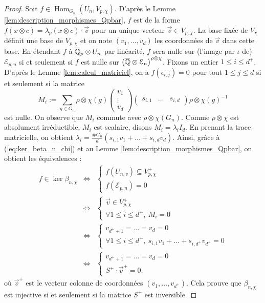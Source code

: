 \documentclass[12pt]{amsart}
\newcommand\bQ{\mathbb{Q}}
\newcommand\cE{\mathcal{E}}
\newcommand{\ob}[1]{\mkern 1.5mu\overline{\mkern-1.5mu#1\mkern-1.5mu}\mkern 1.5mu}
\DeclareMathOperator{\Hom}{Hom}
\theoremstyle{defstyle}
\theoremstyle{thmstyle}
\begin{document}
\begin{proof}
	Soit $f \in \Hom_{G_n}(U_n,V_{p,\chi})$. D'après le Lemme \ref{lem:description_morphismes_Qpbar}, $f$ est de la forme $f(x\otimes c) = \lambda_p(x\otimes c) \cdot \vec{v} $ pour un unique vecteur $\vec{v}\in V_{p,\chi}$. La base fixée de $V_\chi$ définit une base de $V_{p,\chi}$ et on note $(v_1,\ldots,v_d)$ les coordonnées de $\vec{v}$ dans cette base. En étendant $f$ à $\ob{\bQ}_p \otimes U_n$ par linéarité, $f$ sera nulle sur (l'image par $\iota$ de) $\cE_{p,n}$ si et seulement si $f$ est nulle sur $\left(\ob{\bQ}\otimes \cE_n \right)^{\rho\otimes\chi}$. Fixons un entier $1\leq i\leq d^+$. D'après le Lemme \ref{lem:calcul_matriciel}, on a $ f(\epsilon_{i,j})=0$ pour tout $1\leq j\leq d$ si et seulement si la matrice 
	$$M_i:= \sum_{g \in G_n} \rho\otimes \chi(g) \begin{pmatrix} v_1 \\ \vdots \\ v_d \end{pmatrix} \begin{pmatrix}
	s_{i,1} & \ldots & s_{i,d} \end{pmatrix} \rho\otimes\chi(g)^{-1}
	$$
	est nulle. 
	On observe que $M_i$ commute avec $\rho\otimes\chi(G_n)$. Comme $\rho\otimes\chi$ est absolument irréductible, $M_i$ est scalaire, disons $M_i=\lambda_i I_d$. En prenant la trace matricielle, on obtient $\lambda_i=\frac{\#G_n}{d} \left(s_{i,1}v_1+\ldots + s_{i,d}v_d\right)$. Ainsi, grâce à (\ref{eq:ker_beta_n_chi}) et au Lemme \ref{lem:description_morphismes_Qpbar}, on obtient les équivalences : 
	$$\begin{array}{rcl}
	f\in \ker \beta_{n,\chi} &\Longleftrightarrow & \left\{\begin{array}{l}
	f(U_{n,v}) \subseteq V_{p,\chi}^+ \\ f(\cE_{p,n})=0 
	\end{array}\right. \\
	&\Longleftrightarrow & \left\{\begin{array}{l}
	\vec{v}\in V_{p,\chi}^+ \\ \forall 1 \leq i \leq d^+, \ M_i=0 
	\end{array}\right. \\
	&\Longleftrightarrow & \left\{\begin{array}{l}
	v_{d^++1}=\ldots=v_d=0 \\ \forall 1 \leq i \leq d^+, \ s_{i,1}v_1+\ldots + s_{i,d^+}v_{d^+}=0 
	\end{array}\right. \\
	&\Longleftrightarrow & \left\{\begin{array}{l}
	v_{d^++1}=\ldots=v_d=0 \\ S^+ \cdot\vec{v}^+=0 ,
	\end{array}\right.
	\end{array}
	$$
	où $\vec{v}^+$ est le vecteur colonne de coordonnées $(v_1,\ldots,v_{d^+})$. Cela prouve que $\beta_{n,\chi}$ est injective si et seulement si la matrice $S^+$ est inversible. 
\end{proof}
\end{document}
